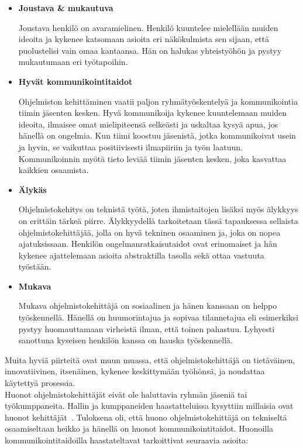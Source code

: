 \documentclass[finnish]{../tktltiki2}
\theoremstyle{definition}
\theoremstyle{remark}
\begin{document}
\begin{itemize}

\item {\bf Joustava \& mukautuva}

Joustava henkilö on avaramielinen. Henkilö kuuntelee mielellään muiden
ideoita ja kykenee katsomaan asioita eri näkökulmista sen sijaan, että
puolustelisi vain omaa kantaansa. Hän on halukas yhteistyöhön
ja pystyy mukautumaan eri työtapoihin.

\item {\bf Hyvät kommunikointitaidot}

Ohjelmiston kehittäminen vaatii paljon ryhmätyöskentelyä ja
kommunikointia tiimin jäsenten kesken. Hyvä kommunikoija kykenee
kuuntelemaan muiden ideoita, ilmaisee omat mielipiteensä selkeästi ja uskaltaa
kysyä apua, jos hänellä on ongelmia. Kun tiimi koostuu jäsenistä,
jotka kommunikoivat usein ja hyvin, se vaikuttaa positiivisesti
ilmapiiriin ja työn laatuun. Kommunikoinnin myötä
tieto leviää tiimin jäsenten kesken, joka kasvattaa kaikkien osaamista.

\item {\bf Älykäs}

Ohjelmistokehitys on teknistä työtä, joten
ihmistaitojen lisäksi myös älykkyys on erittäin tärkeä piirre.
Älykkyydellä tarkoitetaan tässä tapauksessa sellaista ohjelmistokehittäjää, jolla on hyvä tekninen osaaminen ja, joka on nopea
ajatuksissaan. Henkilön ongelmanratkaisutaidot ovat erinomaiset
ja hän kykenee ajattelemaan asioita abstraktilla tasolla sekä ottaa
vastuuta työstään.

\item {\bf Mukava}

Mukava ohjelmistokehittäjä on sosiaalinen ja hänen kanssaan on
helppo työskennellä. Hänellä on huumorintajua ja sopivaa
tilannetajua eli esimerkiksi pystyy huomauttamaan virheistä ilman,
että toinen pahastuu. Lyhyesti sanottuna kyseisen henkilön kanssa
on hauska työskennellä.

\end{itemize}

Muita hyviä piirteitä ovat muun muassa, että ohjelmistokehittäjä
on tietäväinen, innovatiivinen, itsenäinen, kykenee keskittymään työhönsä, ja noudattaa käytettyä prosessia.\\

Huonot ohjelmistokehittäjät eivät ole haluttavia ryhmän jäseniä tai
työkumppaneita. Hallin ja kumppaneiden haastatteluissa kysyttiin millaisia ovat huonot kehittäjät~\cite{Hall:2007:CNT:1235000.1235043}. Tuloksena oli, että huono ohjelmistokehittäjä on tekniseltä osaamiseltaan heikko ja hänellä on huonot kommunikointitaidot. Huonoilla kommunikointitaidoilla haastateltavat tarkoittivat seuraavia asioita:
\end{document}
